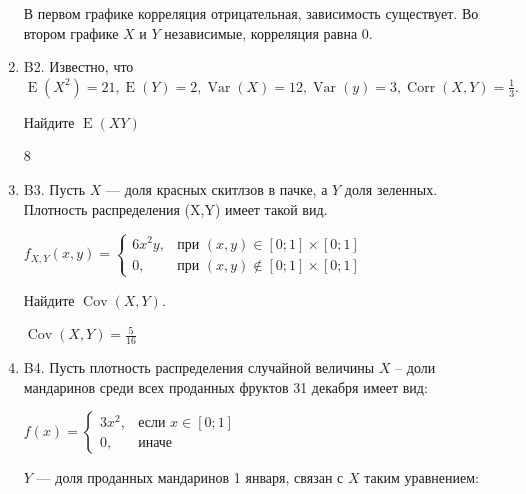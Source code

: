 \documentclass[12pt]{article}
\DeclareMathOperator{\Cov}{Cov}
\DeclareMathOperator{\Corr}{Corr}
\DeclareMathOperator{\Var}{Var}
\DeclareMathOperator{\E}{E}
\newenvironment{problem}{}{}
\newenvironment{sol}{}{} %
\begin{document}
\begin{enumerate}
\begin{problem}
\begin{sol}
В первом графике корреляция отрицательная, зависимость существует. Во втором графике $X$ и $Y$ независимые, корреляция равна $0$. 

\end{sol}
\end{problem}

\begin{problem}
\item[B2.] Известно, что $\E(X^2)=21,\E(Y) = 2, \Var(X) = 12,\Var(y) = 3, \Corr(X,Y) = \frac{1}{{3}}.$

Найдите $\E(XY)$

\begin{sol}
$8$
\end{sol}
\end{problem}

\begin{problem}
\item[B3.] 
Пусть $X$ — доля красных скитлзов в пачке, а $Y$ доля зеленных. Плотность распределения (X,Y) имеет такой вид.

\begin{center} $f_{X,Y}(x,y) = \begin{cases} 6x^2y, & \mbox{при } (x,y) \in [0;1] \times [0;1] \\ 0 , & \mbox{при } (x,y) \not\in [0;1] \times [0;1]\end{cases}$\end{center}

Найдите $\Cov(X,Y)$.

\begin{sol}
$\Cov(X,Y) = \frac{5}{16}$
\end{sol}
\end{problem}

\begin{problem}
\item[B4.] Пусть плотность распределения случайной величины $X$ – доли мандаринов среди всех проданных фруктов 31 декабря имеет вид:
\begin{center} $f(x) = \begin{cases} 3x^2, & \mbox{если } x \in [0;1] \\ 0 , & \mbox{иначе }  \end{cases}$  \end{center}
$Y$ — доля проданных мандаринов 1 января, связан с $X$ таким уравнением:


\end{problem}
\end{enumerate}
\end{document}
